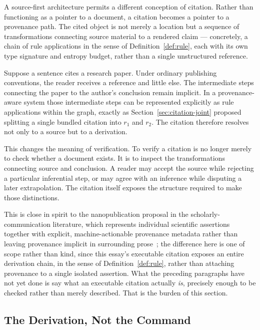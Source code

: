 \documentclass[11pt]{article}
\theoremstyle{definition}
\begin{document}
A source-first architecture permits a different conception of citation. Rather than functioning as a pointer to a document, a citation becomes a pointer to a provenance path. The cited object is not merely a location but a sequence of transformations connecting source material to a rendered claim --- concretely, a chain of rule applications in the sense of Definition~\ref{def:rule}, each with its own type signature and entropy budget, rather than a single unstructured reference.

Suppose a sentence cites a research paper. Under ordinary publishing conventions, the reader receives a reference and little else. The intermediate steps connecting the paper to the author's conclusion remain implicit. In a provenance-aware system those intermediate steps can be represented explicitly as rule applications within the graph, exactly as Section~\ref{sec:citation-joint} proposed splitting a single bundled citation into $r_1$ and $r_2$. The citation therefore resolves not only to a source but to a derivation.

This changes the meaning of verification. To verify a citation is no longer merely to check whether a document exists. It is to inspect the transformations connecting source and conclusion. A reader may accept the source while rejecting a particular inferential step, or may agree with an inference while disputing a later extrapolation. The citation itself exposes the structure required to make those distinctions.

This is close in spirit to the nanopublication proposal in the scholarly-communication literature, which represents individual scientific assertions together with explicit, machine-actionable provenance metadata rather than leaving provenance implicit in surrounding prose~\cite{groth2010}; the difference here is one of scope rather than kind, since this essay's executable citation exposes an entire derivation chain, in the sense of Definition~\ref{def:rule}, rather than attaching provenance to a single isolated assertion. What the preceding paragraphs have not yet done is say what an executable citation actually \emph{is}, precisely enough to be checked rather than merely described. That is the burden of this section.

\subsection{The Derivation, Not the Command}
\end{document}
